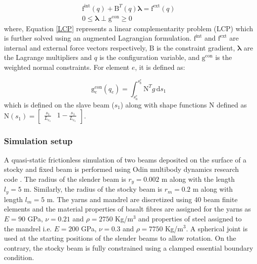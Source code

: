 \begin{subequations}
\begin{gather}
\boldsymbol{\mathrm{f}}^{\textrm{int}}(q) + \boldsymbol{\mathrm{B}}^{T}(q) \boldsymbol{\lambda} = \boldsymbol{\mathrm{f}}^{\textrm{ext}}(q)\\ %
\boldsymbol{\mathrm{0}} \leq \boldsymbol{\lambda} \perp \boldsymbol{\mathrm{g}}^{\textrm{con}} \geq \boldsymbol{\mathrm{0}} \label{LCP}
\end{gather}
\label{equilibrium}
\end{subequations}
where, Equation \ref{LCP} represents a linear complementarity problem (LCP) which is further solved using an augmented Lagrangian formulation. $\boldsymbol{\mathrm{f}}^{\textrm{int}}$ and $\boldsymbol{\mathrm{f}}^{\textrm{ext}}$ are internal and external force vectors respectively, $\boldsymbol{\mathrm{B}}$ is the constraint gradient, $\boldsymbol{\lambda}$ are the Lagrange multipliers and $q$ is the configuration variable, and $\boldsymbol{\mathrm{g}}^{\textrm{con}}$ is the weighted normal constraints. For element $e$, it is defined as: 

\begin{equation}
    \boldsymbol{\mathrm{g}}_e^{\textrm{con}}(q_e) = \int_{s^e_{a}}^{s^e_{b}} \boldsymbol{\mathrm{N}}^{T} g \, \mathrm{d}s_1
\end{equation}
which is defined on the slave beam ($s_1$) along with shape functions $\boldsymbol{\mathrm{N}}$ defined as $\boldsymbol{\mathrm{N}} (s_1) = \begin{bmatrix}
\frac{s_1}{L_{e_1}} & 1 - \frac{s_1}{L_{e_1}} 
\end{bmatrix}$. 

\subsubsection{Simulation setup}
A quasi-static frictionless simulation of two beams deposited on the surface of a stocky and fixed beam is performed using Odin multibody dynamics research code \cite{odin2022}. The radius of the slender beam is $r_y = 0.002$ m along with the length $l_y = 5$ m. Similarly, the radius of the stocky beam is $r_m = 0.2$ m along with length $l_m = 5$ m. The yarns and mandrel are discretized using 40 beam finite elements and the material properties of basalt fibres are assigned for the yarns as $E = 90$ GPa, $\nu = 0.21$ and $\rho = 2750$ Kg/m$^3$ and properties of steel assigned to the mandrel i.e. $E = 200$ GPa, $\nu = 0.3$ and $\rho = 7750$ Kg/m$^3$. A spherical joint is used at the starting positions of the slender beams to allow rotation. On the contrary, the stocky beam is fully constrained using a clamped essential boundary condition.\\

